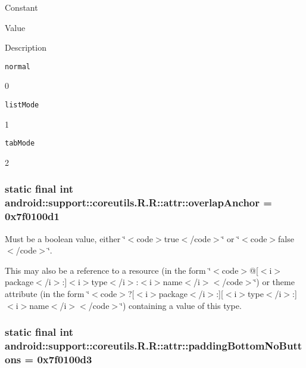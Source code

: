 Constant

Value

Description 

{\tt normal}

0

{\tt listMode}

1

{\tt tabMode}

2\hypertarget{classandroid_1_1support_1_1coreutils_1_1_r_1_1attr_2782b1c03cbdbb0297a67cf4440dc258}{
\subsubsection[{overlapAnchor}]{\setlength{\rightskip}{0pt plus 5cm}static final int android::support::coreutils.R.R::attr::overlapAnchor = 0x7f0100d1}}
\label{classandroid_1_1support_1_1coreutils_1_1_r_1_1attr_2782b1c03cbdbb0297a67cf4440dc258}


Must be a boolean value, either \char`\"{}$<$code$>$true$<$/code$>$\char`\"{} or \char`\"{}$<$code$>$false$<$/code$>$\char`\"{}. 

This may also be a reference to a resource (in the form \char`\"{}$<$code$>$@\mbox{[}$<$i$>$package$<$/i$>$:\mbox{]}$<$i$>$type$<$/i$>$:$<$i$>$name$<$/i$>$$<$/code$>$\char`\"{}) or theme attribute (in the form \char`\"{}$<$code$>$?\mbox{[}$<$i$>$package$<$/i$>$:\mbox{]}\mbox{[}$<$i$>$type$<$/i$>$:\mbox{]}$<$i$>$name$<$/i$>$$<$/code$>$\char`\"{}) containing a value of this type. \hypertarget{classandroid_1_1support_1_1coreutils_1_1_r_1_1attr_447e91e4544febfac183abdfbb3c68a4}{
\subsubsection[{paddingBottomNoButtons}]{\setlength{\rightskip}{0pt plus 5cm}static final int android::support::coreutils.R.R::attr::paddingBottomNoButtons = 0x7f0100d3}}
\label{classandroid_1_1support_1_1coreutils_1_1_r_1_1attr_447e91e4544febfac183abdfbb3c68a4}


